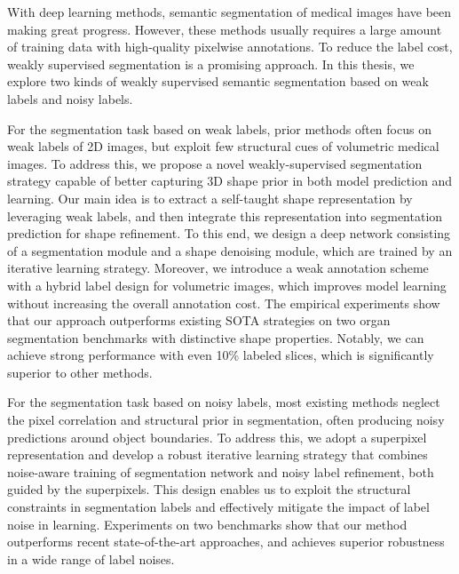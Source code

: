 \begin{abstract*}[flattitle]
With deep learning methods, semantic segmentation of medical images have been making great progress. However, these methods usually requires a large amount of training data with high-quality pixelwise annotations. To reduce the label cost, weakly supervised segmentation is a promising approach. In this thesis, we explore two kinds of weakly supervised semantic segmentation based on weak labels and noisy labels.

For the segmentation task based on weak labels, prior methods often focus on weak labels of 2D images, but exploit few structural cues of volumetric medical images. To address this, we propose a novel weakly-supervised segmentation strategy capable of better capturing 3D shape prior in both model prediction and learning. Our main idea is to extract a self-taught shape representation by leveraging weak labels, and then integrate this representation into segmentation prediction for shape refinement. To this end, we design a deep network consisting of a segmentation module and a shape denoising module, which are trained by an iterative learning strategy. Moreover, we introduce a weak annotation scheme with a hybrid label design for volumetric images, which improves model learning without increasing the overall annotation cost. The empirical experiments show that our approach outperforms existing SOTA strategies on two organ segmentation benchmarks with distinctive shape properties. Notably, we can achieve strong performance with even 10\% labeled slices, which is significantly superior to other methods. 

For the segmentation task based on noisy labels, most existing methods neglect the pixel correlation and structural prior in segmentation, often producing noisy predictions around object boundaries. To address this, we adopt a superpixel representation and develop a robust iterative learning strategy that combines noise-aware training of segmentation network and noisy label refinement, both guided by the superpixels. This design enables us to exploit the structural constraints in segmentation labels and effectively mitigate the impact of label noise in learning. Experiments on two benchmarks show that our method outperforms recent state-of-the-art approaches, and achieves superior robustness in a wide range of label noises.


\end{abstract*}